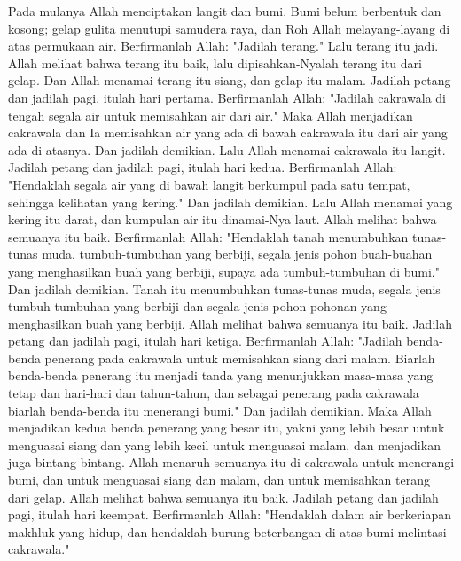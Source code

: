 
\begin{biblechapter} %
 Pada mulanya Allah menciptakan langit dan bumi.
\verse Bumi belum berbentuk dan kosong; gelap gulita menutupi samudera raya, dan Roh Allah melayang-layang di atas permukaan air.
\verse Berfirmanlah Allah: "Jadilah terang." Lalu terang itu jadi.
\verse Allah melihat bahwa terang itu baik, lalu dipisahkan-Nyalah terang itu dari gelap.
\verse Dan Allah menamai terang itu siang, dan gelap itu malam. Jadilah petang dan jadilah pagi, itulah hari pertama.
\verse Berfirmanlah Allah: "Jadilah cakrawala di tengah segala air untuk memisahkan air dari air."
\verse Maka Allah menjadikan cakrawala dan Ia memisahkan air yang ada di bawah cakrawala itu dari air yang ada di atasnya. Dan jadilah demikian.
\verse Lalu Allah menamai cakrawala itu langit. Jadilah petang dan jadilah pagi, itulah hari kedua.
\verse Berfirmanlah Allah: "Hendaklah segala air yang di bawah langit berkumpul pada satu tempat, sehingga kelihatan yang kering." Dan jadilah demikian.
\verse Lalu Allah menamai yang kering itu darat, dan kumpulan air itu dinamai-Nya laut. Allah melihat bahwa semuanya itu baik.
\verse Berfirmanlah Allah: "Hendaklah tanah menumbuhkan tunas-tunas muda, tumbuh-tumbuhan yang berbiji, segala jenis pohon buah-buahan yang menghasilkan buah yang berbiji, supaya ada tumbuh-tumbuhan di bumi." Dan jadilah demikian.
\verse Tanah itu menumbuhkan tunas-tunas muda, segala jenis tumbuh-tumbuhan yang berbiji dan segala jenis pohon-pohonan yang menghasilkan buah yang berbiji. Allah melihat bahwa semuanya itu baik.
\verse Jadilah petang dan jadilah pagi, itulah hari ketiga.
\verse Berfirmanlah Allah: "Jadilah benda-benda penerang pada cakrawala untuk memisahkan siang dari malam. Biarlah benda-benda penerang itu menjadi tanda yang menunjukkan masa-masa yang tetap dan hari-hari dan tahun-tahun,
\verse dan sebagai penerang pada cakrawala biarlah benda-benda itu menerangi bumi." Dan jadilah demikian.
\verse Maka Allah menjadikan kedua benda penerang yang besar itu, yakni yang lebih besar untuk menguasai siang dan yang lebih kecil untuk menguasai malam, dan menjadikan juga bintang-bintang.
\verse Allah menaruh semuanya itu di cakrawala untuk menerangi bumi,
\verse dan untuk menguasai siang dan malam, dan untuk memisahkan terang dari gelap. Allah melihat bahwa semuanya itu baik.
\verse Jadilah petang dan jadilah pagi, itulah hari keempat.
\verse Berfirmanlah Allah: "Hendaklah dalam air berkeriapan makhluk yang hidup, dan hendaklah burung beterbangan di atas bumi melintasi cakrawala."

\end{biblechapter}
